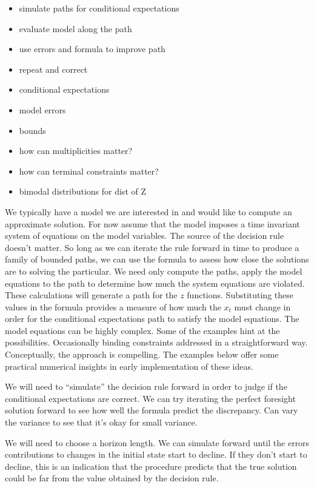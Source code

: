 \documentclass[12pt]{article}
\begin{document}
\begin{itemize}
\item simulate paths for conditional expectations
\item evaluate model along the path
\item use errors and formula to improve path 
\item repeat and correct
\item conditional expectations
\item model errors
\item bounds
\item how can multiplicities matter?  
\item how can terminal constraints matter?
\item bimodal distributions for dist of Z
\end{itemize}



We typically have a model we are interested in and would like to compute an approximate solution.  For now assume that the model imposes a time invariant system of equations on the model variables.
The source of the decision rule doesn't matter.  So long as we can iterate the
rule forward in time to produce a family of bounded paths, we can use the
formula to assess how close the solutions are to solving the particular.
We need only compute the paths, apply the model equations to the path to determine how much the system equations are violated.  These calculations will 
generate a path for the $z$ functions.  Substituting these values in the
formula provides a measure of how much the $x_t$ must change in order for the conditional expectations path to satisfy the model equations.
The model equations can be highly complex. Some of the examples hint at the 
possibilities. Occasionally binding constraints addressed in a straightforward 
way.  Conceptually, the approach is compelling.  The examples below
offer some practical numerical insights in early implementation of these
ideas.



We will need to ``simulate'' the decision rule forward in order to judge if the conditional expectations are correct.
We can try iterating the perfect foresight solution forward to see how well the formula predict the discrepancy.  Can vary the variance to see that it's okay for small variance.

We will need to choose a horizon length. We can simulate forward until the errors contributions to changes in the initial state start to decline.
If they don't start to decline, this is an indication that the procedure 
predicts that the true solution could be far from the value obtained by the
decision rule.
\end{document}

